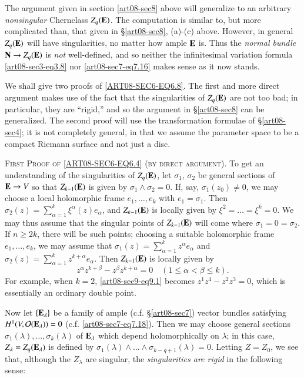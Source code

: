 The argument given in section \ref{art08-sec8} above will generalize to an arbitrary {\em nonsingular} Chern\pageoriginale class $Z_{q}(\mathbf{E})$. The computation is similar to, but more complicated than, that given in \S\ref{art08-sec8}, (a)-(c) above. However, in general $Z_{q}(\mathbf{E})$ will have singularities, no matter how ample $\mathbf{E}$ is. Thus the {\em normal bundle} $\mathbf{N}\to Z_{q}(\mathbf{E})$ is {\em not} well-defined, and so neither the infinitesimal variation formula \eqref{art08-sec3-eq3.8} nor \eqref{art08-sec7-eq7.16} makes sense as it now stands.

We shall give two proofs of \eqref{ART08-SEC6-EQ6.8}. The first and more direct argument makes use of the fact that the singularities of $Z_{q}(\mathbf{E})$ are not too bad; in particular, they are ``rigid,'' and so the argument in \S\ref{art08-sec8} can be generalized. The second proof will use the transformation formulae of \S\ref{art08-sec4}; it is not completely general, in that we assume the parameter space to be a compact Riemann surface and not just a disc.

\medskip
\textsc{First Proof of \eqref{ART08-SEC6-EQ6.4} (by direct argument).} To get an understanding of the singularities of $Z_{q}(\mathbf{E})$, let $\sigma_{1}$, $\sigma_{2}$ be general sections of $\mathbf{E}\to V$ so that $Z_{k-1}(\mathbf{E})$ is given by $\sigma_{1}\wedge \sigma_{2}=0$. If, say, $\sigma_{1}(z_{0})\neq 0$, we may choose a local holomorphic frame $e_{1},\ldots,e_{k}$ with $e_{1}=\sigma_{1}$. Then $\sigma_{2}(z)=\sum\limits^{k}_{\alpha=1}\xi^{\alpha}(z)e_{\alpha}$, and $Z_{k-1}(\mathbf{E})$ is locally given by $\xi^{2}=\ldots=\xi^{k}=0$. We may thus assume that the singular points of $Z_{k-1}(\mathbf{E})$ will come where $\sigma_{1}=0=\sigma_{2}$. If $n\geq 2k$, there will be such points; choosing a suitable holomorphic frame $e_{1},\ldots,e_{k}$, we may assume that $\sigma_{1}(z)=\sum\limits^{k}_{\alpha=1}z^{\alpha}e_{\alpha}$ and $\sigma_{2}(z)=\sum\limits^{k}_{\alpha=1}z^{k+\alpha}e_{\alpha}$. Then $Z_{k-1}(\mathbf{E})$ is locally given by
\setcounter{equation}{0}
\begin{equation}
z^{\alpha}z^{k+\beta}-z^{\beta}z^{k+\alpha}=0\quad (1\leq \alpha<\beta \leq k).\label{art08-sec9-eq9.1}
\end{equation}
For example, when $k=2$, \eqref{art08-sec9-eq9.1} becomes $z^{1}z^{4}-z^{2}z^{3}=0$, which is essentially an ordinary double point.

Now let $\{\mathbf{E}_{\lambda}\}$ be a family of ample (c.f. \S\ref{art08-sec7}) vector bundles satisfying $H^{1}(V,\mathcal{O}(\mathbf{E}_{\lambda}))=0$ (c.f. \eqref{art08-sec7-eq7.18}). Then we may choose general sections $\sigma_{1}(\lambda),\ldots,\sigma_{k}(\lambda)$ of $\mathbf{E}_{\lambda}$ which depend holomorphically on $\lambda$; in this case, $Z_{\lambda}=Z_{q}(\mathbf{E}_{\lambda})$ is defined by $\sigma_{1}(\lambda)\wedge\ldots\wedge \sigma_{k-q+1}(\lambda)=0$. Letting $Z=Z_{0}$, we see that, although the $Z_{\lambda}$ are singular, the {\em singularities are rigid} in the following sense:

